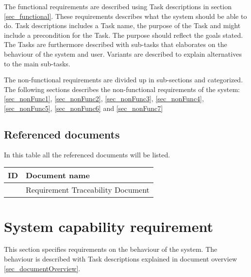 The functional requirements are described using Task descriptions in section \ref{sec_functional}. These requirements describes what the system should be able to do. Task descriptions includes a Task name, the purpose of the Task and might include a precondition for the Task. The purpose should reflect the goals stated. The Tasks are furthermore described with sub-tasks that elaborates on the behaviour of the system and user.  Variants are described to explain alternatives to the main sub-tasks. \citep{taskDescription}

The non-functional requirements are divided up in sub-sections and categorized. The following sections describes the non-functional requirements of the system: \ref{sec_nonFunc1}, \ref{sec_nonFunc2}, \ref{sec_nonFunc3}, \ref{sec_nonFunc4}, \ref{sec_nonFunc5}, \ref{sec_nonFunc6} and \ref{sec_nonFunc7} 
 


\subsection{Referenced documents}
In this table all the referenced documents will be listed.

\begin{tabular}{b{6cm} b{7cm}}
	\textbf{ID} & \textbf{Document name} \\
	\hline
	\rtm & Requirement Traceability Document \\
\end{tabular}

\newpage
\label{sec_functional}
\section{System capability requirement}
This section specifies requirements on the behaviour of the system. The behaviour is described with Task descriptions explained in document overview \ref{sec_documentOverview}.

